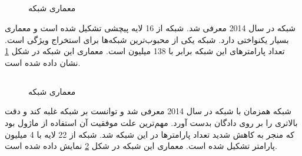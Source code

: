 \subsection{}
	\begin{figure}
		\caption[معماری شبکه ]{معماری شبکه 
			\href{https://towardsdatascience.com/illustrated-10-cnn-architectures-95d78ace614d\#c5a6}{}}
		\label{fig:VGGNet}
	\end{figure}
	شبکه 
	\cite{simonyan2014very}
	در سال 2014 معرفی شد. شبکه
	 از 16 لایه پیچشی تشکیل شده است و معماری بسیار یکنواختی دارد. شبکه
	 یکی از محبوب‌ترین شبکه‌ها برای استخراج ویژگی است. تعداد پارامترهای این شبکه برابر با 138 میلیون است.  معماری این شبکه در شکل 
	 \ref{fig:VGGNet}
	 نشان داده شده است.
 
\subsection{}
	\begin{figure}
		\caption[معماری شبکه ]{معماری شبکه
			\href{https://towardsdatascience.com/illustrated-10-cnn-architectures-95d78ace614d\#81e0}{}}
		\label{fig:GoogleNet}
	\end{figure}
	شبکه
	\cite{szegedy2015going}
	همزمان با شبکه 
	در سال 2014 معرفی شد و  توانست بر شبکه
	غلبه کند و دقت بالاتری را بر روی دادگان
	بدست آورد. مهم‌ترین علت موفقیت آن استفاده از ماژول
	بود که منجر به کاهش شدید تعداد پارامترها در این شبکه شد. شبکه
	از 22 لایه با 4 میلیون پارامتر تشکیل شده است. معماری این شبکه در شکل 
	\ref{fig:GoogleNet}
	نمایش داده شده است.

